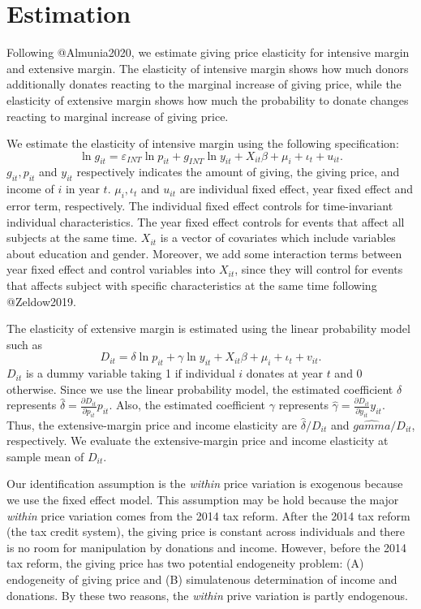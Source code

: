 \documentclass[
]{article}
\begin{document}
\hypertarget{estimation}{%
\section{Estimation}\label{estimation}}

Following @Almunia2020, we estimate giving price elasticity for intensive margin and extensive margin. The elasticity of intensive margin shows how much donors additionally donates reacting to the marginal increase of giving price, while the elasticity of extensive margin shows how much the probability to donate changes reacting to marginal increase of giving price.

We estimate the elasticity of intensive margin using the following specification:
\[
\ln g_{it} = \varepsilon_{INT} \ln p_{it} +g_{INT} \ln y_{it} + X_{it}\beta +\mu_i +\iota_t +u_{it}. \label{intensive}
\]
\(g_{it}, p_{it}\) and \(y_{it}\) respectively indicates the amount of giving, the giving price, and income of \(i\) in year \(t\). \(\mu_i, \iota_t\) and \(u_{it}\) are individual fixed effect, year fixed effect and error term, respectively.
The individual fixed effect controls for time-invariant individual characteristics. The year fixed effect controls for events that affect all subjects at the same time. \(X_{it}\) is a vector of covariates which include variables about education and gender. Moreover, we add some interaction terms between year fixed effect and control variables into \(X_{it}\), since they will control for events that affects subject with specific characteristics at the same time following @Zeldow2019.

The elasticity of extensive margin is estimated using the linear probability model such as
\[
D_{it} =  \delta \ln p_{it} +\gamma \ln y_{it} + X_{it}\beta+\mu_i  +\iota_t +v_{it}. \label{extensive}
\]
\(D_{it}\) is a dummy variable taking 1 if individual \(i\) donates at year \(t\) and 0 otherwise.
\color{red}
Since we use the linear probability model,
the estimated coefficient \(\delta\) represents \(\hat{\delta} = \frac{\partial D_{it}}{\partial p_{it}} p_{it}\).
Also, the estimated coefficient \(\gamma\) represents \(\hat{\gamma} = \frac{\partial D_{it}}{\partial y_{it}} y_{it}\).
Thus, the extensive-margin price and income elasticity are \(\hat{\delta}/D_{it}\) and \(\hat{gamma}/D_{it}\), respectively.
We evaluate the extensive-margin price and income elasticity at sample mean of \(D_{it}\).

Our identification assumption is the \emph{within} price variation is exogenous because we use the fixed effect model.
This assumption may be hold because the major \emph{within} price variation comes from the 2014 tax reform.
After the 2014 tax reform (the tax credit system), the giving price is constant across individuals and
there is no room for manipulation by donations and income.
However, before the 2014 tax reform, the giving price has two potential endogeneity problem:
(A) endogeneity of giving price and (B) simulatenous determination of income and donations.
By these two reasons, the \emph{within} prive variation is partly endogenous.
\end{document}
